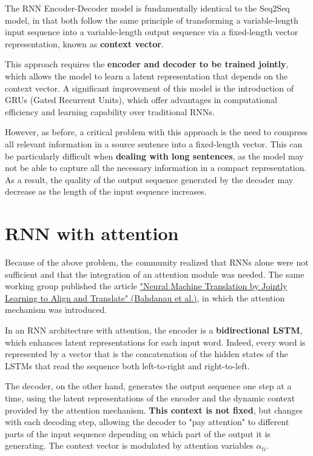 The RNN Encoder-Decoder model is fundamentally identical to the Seq2Seq model, in that both follow the same principle of transforming a variable-length input sequence into a variable-length output sequence via a fixed-length vector representation, known as \textbf{context vector}. 

This approach requires the \textbf{encoder and decoder to be trained jointly}, which allows the model to learn a latent representation that depends on the context vector. A significant improvement of this model is the introduction of GRUs (Gated Recurrent Units), which offer advantages in computational efficiency and learning capability over traditional RNNs.

However, as before, a critical problem with this approach is the need to compress all relevant information in a source sentence into a fixed-length vector. This can be particularly difficult when \textbf{dealing with long sentences}, as the model may not be able to capture all the necessary information in a compact representation. As a result, the quality of the output sequence generated by the decoder may decrease as the length of the input sequence increases.

\section{RNN with attention}

Because of the above problem, the community realized that RNNs alone were not sufficient and that the integration of an attention module was needed. The same working group published the article \href{https://arxiv.org/pdf/1409.0473}{"Neural Machine Translation by Jointly Learning to Align and Translate" (Bahdanau et al.)}, in which the attention mechanism was introduced. 

In an RNN architecture with attention, the encoder is a \textbf{bidirectional LSTM}, which enhances latent representations for each input word. Indeed, every word is represented by a vector that is the concatenation of the hidden states of the LSTMs that read the sequence both left-to-right and right-to-left.

The decoder, on the other hand, generates the output sequence one step at a time, using the latent representations of the encoder and the dynamic context provided by the attention mechanism. \textbf{This context is not fixed}, but changes with each decoding step, allowing the decoder to "pay attention" to different parts of the input sequence depending on which part of the output it is generating. The context vector is modulated by attention variables $\alpha_{ti}$.

